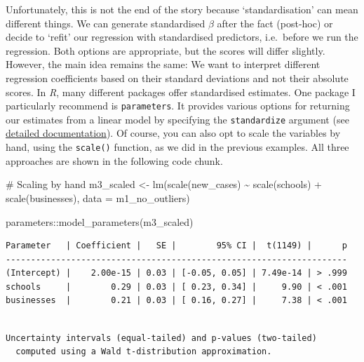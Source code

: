 \documentclass[
  letterpaper,
  DIV=11,
  numbers=noendperiod]{scrreprt}
\newenvironment{Shaded}{\begin{snugshade}}{\end{snugshade}}
\newcommand{\AttributeTok}[1]{\textcolor[rgb]{0.40,0.45,0.13}{#1}}
\newcommand{\CommentTok}[1]{\textcolor[rgb]{0.37,0.37,0.37}{#1}}
\newcommand{\FunctionTok}[1]{\textcolor[rgb]{0.28,0.35,0.67}{#1}}
\newcommand{\NormalTok}[1]{\textcolor[rgb]{0.00,0.23,0.31}{#1}}
\newcommand{\OtherTok}[1]{\textcolor[rgb]{0.00,0.23,0.31}{#1}}
\newcommand{\SpecialCharTok}[1]{\textcolor[rgb]{0.37,0.37,0.37}{#1}}
\begin{document}
Unfortunately, this is not the end of the story because
`standardisation' can mean different things. We can generate
standardised \(\beta\) after the fact (post-hoc) or decide to `refit'
our regression with standardised predictors, i.e.~before we run the
regression. Both options are appropriate, but the scores will differ
slightly. However, the main idea remains the same: We want to interpret
different regression coefficients based on their standard deviations and
not their absolute scores. In \emph{R}, many different packages offer
standardised estimates. One package I particularly recommend is
\texttt{parameters}. It provides various options for returning our
estimates from a linear model by specifying the \texttt{standardize}
argument (see
\href{https://easystats.github.io/parameters/reference/model_parameters.default.html}{detailed
documentation}). Of course, you can also opt to scale the variables by
hand, using the \texttt{scale()} function, as we did in the previous
examples. All three approaches are shown in the following code chunk.

\begin{Shaded}
\begin{Highlighting}[]
\CommentTok{\# Scaling \textquotesingle{}by hand\textquotesingle{}}
\NormalTok{m3\_scaled }\OtherTok{\textless{}{-}} \FunctionTok{lm}\NormalTok{(}\FunctionTok{scale}\NormalTok{(new\_cases) }\SpecialCharTok{\textasciitilde{}}
                  \FunctionTok{scale}\NormalTok{(schools) }\SpecialCharTok{+}
                  \FunctionTok{scale}\NormalTok{(businesses),}
                \AttributeTok{data =}\NormalTok{ m1\_no\_outliers)}

\NormalTok{parameters}\SpecialCharTok{::}\FunctionTok{model\_parameters}\NormalTok{(m3\_scaled)}
\end{Highlighting}
\end{Shaded}

\begin{verbatim}
Parameter   | Coefficient |   SE |        95% CI |  t(1149) |      p
--------------------------------------------------------------------
(Intercept) |    2.00e-15 | 0.03 | [-0.05, 0.05] | 7.49e-14 | > .999
schools     |        0.29 | 0.03 | [ 0.23, 0.34] |     9.90 | < .001
businesses  |        0.21 | 0.03 | [ 0.16, 0.27] |     7.38 | < .001
\end{verbatim}

\begin{verbatim}

Uncertainty intervals (equal-tailed) and p-values (two-tailed)
  computed using a Wald t-distribution approximation.
\end{verbatim}
\end{document}
